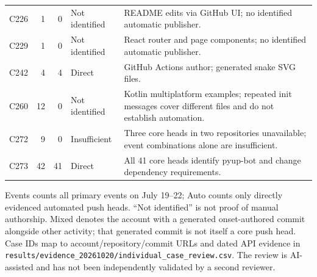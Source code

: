 {\begin{longtable}{@{}p{}rrp{}p{}@{}}
C226 & 1 & 0 & Not identified & README edits via GitHub UI; no identified automatic publisher. \\
C229 & 1 & 0 & Not identified & React router and page components; no identified automatic publisher. \\
C242 & 4 & 4 & Direct & GitHub Actions author; generated snake SVG files. \\
C260 & 12 & 0 & Not identified & Kotlin multiplatform examples; repeated init messages cover different files and do not establish automation. \\
C272 & 9 & 0 & Insufficient & Three core heads in two repositories unavailable; event combinations alone are insufficient. \\
C273 & 42 & 41 & Direct & All 41 core heads identify pyup-bot and change dependency requirements. \\
\end{longtable}}
\noindent\footnotesize Events counts all primary events on July 19--22; Auto counts only directly evidenced automated push heads. ``Not identified'' is not proof of manual authorship. Mixed denotes the account with a generated onset-authored commit alongside other activity; that generated commit is not itself a core push head. Case IDs map to account/repository/commit URLs and dated API evidence in \texttt{results/evidence\_20261020/individual\_case\_review.csv}. The review is AI-assisted and has not been independently validated by a second reviewer.\normalsize
